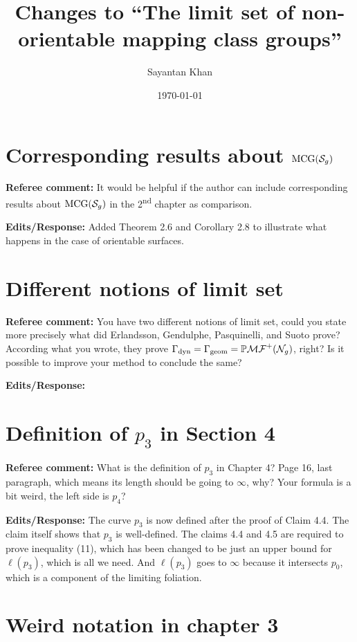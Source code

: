 \documentclass[12pt, reqno]{amsart}
\title{Changes to ``The limit set of non-orientable mapping class groups''}
\author{Sayantan Khan}
\date{\today}
\begin{document}
\maketitle

\section{Corresponding results about $\mathrm{MCG}(\mathcal{S}_g)$}
\label{sec:corr-results-about}

\textbf{Referee comment:} It would be helpful if the author can include corresponding results about $\mathrm{MCG}(\mathcal{S}_g)$ in the 2\textsuperscript{nd} chapter as comparison.

\textbf{Edits/Response:} Added Theorem 2.6 and Corollary 2.8 to illustrate what happens in the case of orientable surfaces.

\section{Different notions of limit set}
\label{sec:diff-noti-limit}

\textbf{Referee comment:} You have two different notions of limit set, could you state more precisely what did Erlandsson, Gendulphe, Pasquinelli, and Suoto prove? According what you wrote, they prove $\Gamma_{\text{dyn}} = \Gamma_{\text{geom}} = \mathbb{P}\mathcal{MF}^+(\mathcal{N}_g)$, right? Is it possible to improve your method to conclude the same?

\textbf{Edits/Response:}

\section{Definition of $p_3$ in Section 4}
\label{sec:defin-p_3-sect}

\textbf{Referee comment:} What is the definition of $p_3$ in Chapter 4? Page 16, last paragraph, which means its length should be going to $\infty$, why? Your formula is a bit weird, the left side is $p_4$?

\textbf{Edits/Response:} The curve $p_3$ is now defined after the proof of Claim 4.4. The claim itself shows that $p_3$ is well-defined.
The claims 4.4 and 4.5 are required to prove inequality (11), which has been changed to be just an upper bound for $\ell(p_3)$, which is all we need. And $\ell(p_3)$ goes to $\infty$ because it intersects $p_0$, which is a component of the limiting foliation.

\section{Weird notation in chapter 3}
\label{sec:weird-notat-chapt}
\end{document}
